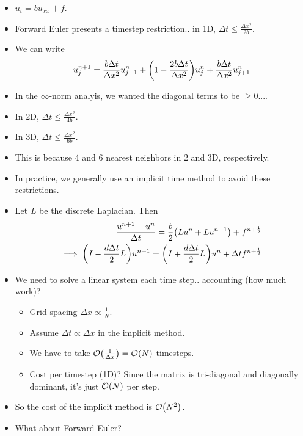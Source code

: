 \documentclass{article}
\newcommand{\Dx}{\Delta x}
\newcommand{\Dt}{\Delta t}
\begin{document}
        \begin{itemize}
            \item $u_t = b u_{xx} + f$.
            \item Forward Euler presents a timestep restriction.. in 1D, $\Dt \leq \frac{\Dx^2}{2b}$.
            \item We can write
            \begin{align*}
                u_j^{n+1} = \frac{b\Dt}{\Dx^2}u_{j-1}^n + \qty(1 - \frac{2b\Dt}{\Dx^2})u_j^n + \frac{b\Dt}{\Dx^2}u_{j+1}^n
            \end{align*}
            \item In the $\infty$-norm analyis, we wanted the diagonal terms to be $\geq 0$....
            \item In 2D, $\Dt \leq \frac{\Dx^2}{4b}$.
            \item In 3D, $\Dt \leq \frac{\Dx^2}{6b}$.
            \item This is because 4 and 6 nearest neighbors in 2 and 3D, respectively.
            \item In practice, we generally use an implicit time method to avoid these restrictions.
            \item Let $L$ be the discrete Laplacian.  Then
            \begin{align*}
                \frac{u^{n+1} - u^n}{\Dt} = \frac{b}{2}\qty(Lu^n + Lu^{n+1}) + f^{n+\frac{1}{2}} \\
                \implies \qty(I - \frac{d\Dt}{2}L)u^{n+1} = \qty(I + \frac{d\Dt}{2}L)u^n + \Dt f^{n+\frac{1}{2}}
            \end{align*}
            \item We need to solve a linear system each time step.. accounting (how much work)?
            \begin{itemize}
                \item Grid spacing $\Dx \propto \frac{1}{N}$.
                \item Assume $\Dt \propto \Dx$ in the implicit method.
                \item We have to take $\order{\frac{1}{\Dx}} = \order{N}$ timesteps.
                \item Cost per timestep (1D)?  Since the matrix is tri-diagonal and diagonally dominant, it's just $\order{N}$ per step.
            \end{itemize}
            \item So the cost of the implicit method is $\order{N^2}$.
            \item What about Forward Euler?

\end{itemize}
\end{document}
